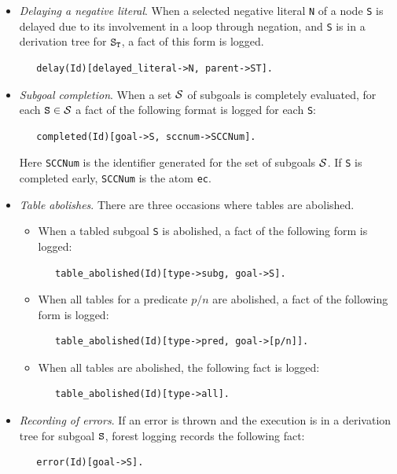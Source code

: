 \documentclass[11pt]{article}
\begin{document}
\begin{itemize}
\item \emph{Delaying a negative literal}. When a selected negative
  literal {\tt N} of a node {\tt S} is delayed due to its involvement
  in a loop through negation, and {\tt S} is in a derivation tree for
  $\tt S_T$, a fact of this form is logged.
\begin{verbatim}  
   delay(Id)[delayed_literal->N, parent->ST].
\end{verbatim}  

\item \emph{Subgoal completion}. When a set ${\cal S}$ of subgoals is 
  completely evaluated, for each $\texttt{S} \in {\cal S}$ a fact of the following
  format is logged for each \texttt{S}: 
\begin{verbatim}  
   completed(Id)[goal->S, sccnum->SCCNum].
\end{verbatim}  
  Here {\tt SCCNum} is the identifier generated for the set of subgoals ${\cal S}$.
  If \texttt{S}  is completed early, {\tt SCCNum} is the atom {\tt ec}. 
  
\item \emph{Table abolishes}. There are three occasions where tables are abolished.
  \begin{itemize}
  \item When a tabled subgoal \texttt{S} is abolished, a fact of 
    the following form is logged:
\begin{verbatim}
   table_abolished(Id)[type->subg, goal->S].
\end{verbatim}  
  \item When all tables for a predicate $p/n$ are abolished, a fact of the 
    following form is logged:
\begin{verbatim}
   table_abolished(Id)[type->pred, goal->[p/n]].
\end{verbatim}  
  \item When all tables are abolished, the following fact is logged:
\begin{verbatim}
   table_abolished(Id)[type->all].
\end{verbatim}  
  \end{itemize}

\item \emph{Recording of errors}. If an error is thrown and the execution
  is in a derivation tree for subgoal $\tt S$, forest logging records 
  the following fact:
\begin{verbatim}
   error(Id)[goal->S].
\end{verbatim}  
\end{itemize}
\end{document}

